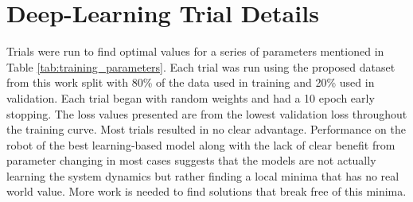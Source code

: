 \section{Deep-Learning Trial Details}
\label{app:learning}

Trials were run to find optimal values for a series of parameters mentioned in Table \ref{tab:training_parameters}. Each trial was run using the proposed dataset from this work split with 80\% of the data used in training and 20\% used in validation. Each trial began with random weights and had a 10 epoch early stopping. The loss values presented are from the lowest validation loss throughout the training curve. Most trials resulted in no clear advantage. Performance on the robot of the best learning-based model along with the lack of clear benefit from parameter changing in most cases suggests that the models are not actually learning the system dynamics but rather finding a local minima that has no real world value. More work is needed to find solutions that break free of this minima.  

\begin{table}[h]
    \centering
    \caption{LSTM layer search}
    \label{tab:arch_lstm}
\end{table}


\begin{table}[h]
    \centering
    \caption{Head layer size search}
    \label{tab:arch_head_size}
\end{table}

